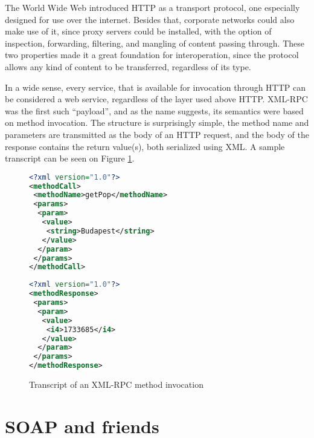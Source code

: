 The World Wide Web introduced HTTP as a transport protocol, one especially designed for use over the internet. Besides that, corporate networks could also make use of it, since proxy servers could be installed, with the option of inspection, forwarding, filtering, and mangling of content passing through. These two properties made it a great foundation for interoperation, since the protocol allows any kind of content to be transferred, regardless of its type.

In a wide sense, every service, that is available for invocation through HTTP can be considered a web service, regardless of the layer used above HTTP. XML-RPC was the first such ``payload'', and as the name suggests, its semantics were based on method invocation. The structure is surprisingly simple, the method name and parameters are transmitted as the body of an HTTP request, and the body of the response contains the return value(s), both serialized using XML. A sample transcript can be seen on Figure \ref{fig:xmlrpc-sample}.

\begin{figure}[htbp]
 \centering
 \begin{minipage}[t]{0.56\linewidth}
  \centering
  \begin{lstlisting}[language=XML, numbers=off]
<?xml version="1.0"?>
<methodCall>
 <methodName>getPop</methodName>
 <params>
  <param>
   <value>
    <string>Budapest</string>
   </value>
  </param>
 </params>
</methodCall>
  \end{lstlisting}
 \end{minipage}
 \hspace{0.5cm}
 \begin{minipage}[t]{0.37\linewidth}
  \centering
  \begin{lstlisting}[language=XML, numbers=off]
<?xml version="1.0"?>
<methodResponse>
 <params>
  <param>
   <value>
    <i4>1733685</i4>
   </value>
  </param>
 </params>
</methodResponse>
  \end{lstlisting}
 \end{minipage}
 \caption{Transcript of an XML-RPC method invocation}
 \label{fig:xmlrpc-sample}
\end{figure}

\section{SOAP and friends}

